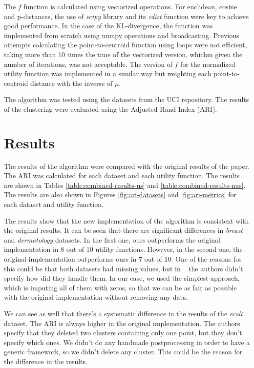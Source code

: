 \documentclass[twocolumn]{article}
\begin{document}
The $f$ function is calculated using vectorized operations. For euclidean, cosine and p-distances, the use of \textit{scipy} library and
its \textit{cdist} function were key to achieve good performance. In the case of the KL-divergence, the function was implemented from scratch
using numpy operations and broadcasting. Previous attempts calculating the point-to-centroid function using loops were not efficient, taking
more than 10 times the time of the vectorized version, whichm given the number of iterations, was not acceptable. The version of $f$ for the
normalized utility function was implemented in a similar way but weighting each point-to-centroid distance with the inverse of $\mu$.

The algorithm was tested using the datasets from the UCI repository. The results of the clustering were evaluated using the Adjusted Rand Index (ARI).


\section{Results}

The results of the algorithm were compared with the original results of the paper. The ARI was calculated for each dataset and each utility function. 
The results are shown in Tables \ref{table:combined-results-us} and \ref{table:combined-results-nus}. The results are also shown in Figures 
\ref{fig:ari-datasets} and \ref{fig:ari-metrics} for each dataset and utility function.

The results show that the new implementation of the algorithm is consistent with the original results. It can be seen that there are significant
differences in \textit{breast} and \textit{dermatology} datasets. In the first one, ours outperforms the original implementation in 8 out of 10 
utility functions. However, in the second one, the original implementation outperforms ours in 7 out of 10. One of the reasons for this could be
that both datasets had missing values, but in ~\cite{Original} the authors didn't specify how did they handle them. In our case, we used the simplest
approach, which is imputing all of them with zeros, so that we can be as fair as possible with the original implementation without removing any data.

We can see as well that there's a systematic difference in the results of the \textit{ecoli} dataset. The ARI is always higher in the original implementation.
The authors specify that they deleted two clusters containing only one point, but they don't specify which ones. We didn't do any handmade postprocessing
in order to have a generic framework, so we didn't delete any cluster. This could be the reason for the difference in the results.
\end{document}
